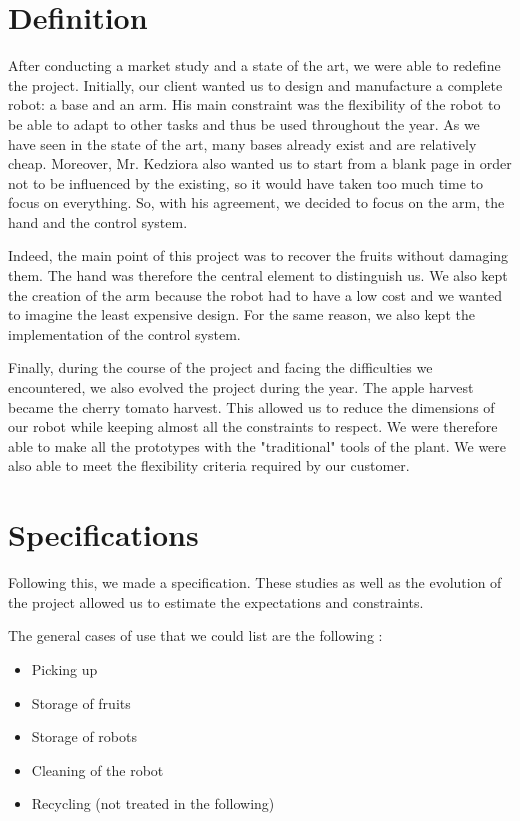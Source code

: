 \documentclass[oneside]{book}
\begin{document}
\section{Definition}

\hspace{\parindent} After conducting a market study and a state of the art, we were able to redefine the project. Initially, our client wanted us to design and manufacture a complete robot: a base and an arm. His main constraint was the flexibility of the robot to be able to adapt to other tasks and thus be used throughout the year. As we have seen in the state of the art, many bases already exist and are relatively cheap. Moreover, Mr. Kedziora also wanted us to start from a blank page in order not to be influenced by the existing, so it would have taken too much time to focus on everything. So, with his agreement, we decided to focus on the arm, the hand and the control system. 

\bigbreak

Indeed, the main point of this project was to recover the fruits without damaging them. The hand was therefore the central element to distinguish us. We also kept the creation of the arm because the robot had to have a low cost and we wanted to imagine the least expensive design. For the same reason, we also kept the implementation of the control system. 

\bigbreak

Finally, during the course of the project and facing the difficulties we encountered, we also evolved the project during the year. The apple harvest became the cherry tomato harvest. This allowed us to reduce the dimensions of our robot while keeping almost all the constraints to respect. We were therefore able to make all the prototypes with the "traditional" tools of the plant. We were also able to meet the flexibility criteria required by our customer. 

\section{Specifications}

\hspace{\parindent} Following this, we made a specification. These studies as well as the evolution of the project allowed us to estimate the expectations and constraints. 

\bigbreak

\noindent The general cases of use that we could list are the following : 
\begin{itemize}[noitemsep]
    \item Picking up
    \item Storage of fruits
    \item Storage of robots
    \item Cleaning of the robot
    \item Recycling (not treated in the following)
\end{itemize}
\end{document}
